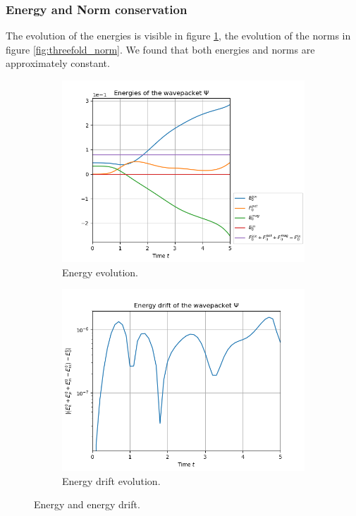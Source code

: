 \documentclass{article}
\begin{document}
\subsubsection{Energy and Norm conservation}
The evolution of the energies is visible in figure \ref{fig:threefold_energy}, the evolution of the norms in figure \ref{fig:threefold_norm}. We found that both energies and norms are approximately constant.
\begin{figure}[h]
  \begin{subfigure}[b]{0.45 \textwidth}
    \includegraphics[width = \textwidth]{graphics/threefold_morse/threefold_energies_block0.PNG}
    \caption{Energy evolution.}
  \end{subfigure}
  \hfill
  \begin{subfigure}[b]{0.45 \textwidth}
    \includegraphics[width = \textwidth]{graphics/threefold_morse/energy_drift_block0_log.PNG}
    \caption{Energy drift evolution.}
  \end{subfigure}
  \caption{Energy and energy drift.}
  \label{fig:threefold_energy}
\end{figure}
\end{document}
